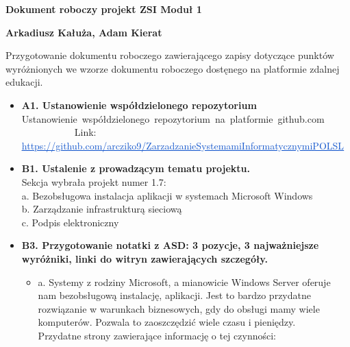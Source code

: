 \documentclass[12pt]{article}
\renewcommand{\_}{\kern-1.5pt\textunderscore\kern-1.5pt}
\begin{document}
\textbf{Dokument roboczy projekt ZSI Moduł 1}\par


\vspace{\baselineskip}
\textbf{Arkadiusz Kałuża, Adam Kierat}\par


\vspace{\baselineskip}
Przygotowanie dokumentu roboczego zawierającego zapisy dotyczące punktów wyróżnionych we wzorze dokumentu roboczego dostęnego na platformie zdalnej edukacji.\par


\vspace{\baselineskip}
\begin{itemize}
	\item \textbf{A1. Ustanowienie współdzielonego repozytorium}\\
Ustanowienie\ współdzielonego\ repozytorium\ na\ platformie\ github.com\ \ \ \ \ \ \ \ \ \ \ \ \ \ \ \       Link: \href{https://github.com/arcziko9/ZarzadzanieSystemamiInformatycznymiPOLSL}{\textcolor[HTML]{1155CC}{\ul{https://github.com/arcziko9/ZarzadzanieSystemamiInformatycznymiPOLSL}}}\\
\par

	\item \textbf{B1. Ustalenie z prowadzącym tematu projektu.}\\
Sekcja wybrała projekt numer 1.7:\\
 \tab a. Bezobsługowa instalacja aplikacji w systemach Microsoft Windows\\
 \tab b. Zarządzanie infrastrukturą sieciową\\
 \tab c. Podpis elektroniczny\\
\par

	\item \textbf{B3. Przygotowanie notatki z ASD: 3 pozycje, 3 najważniejsze wyróżniki, linki do witryn zawierających szczegóły.}\par

\begin{itemize}
	\item a. Systemy z rodziny Microsoft, a mianowicie Windows Server oferuje nam bezobsługową instalację, aplikacji. Jest to bardzo przydatne rozwiązanie w warunkach biznesowych, gdy do obsługi mamy wiele komputerów. Pozwala to zaoszczędzić wiele czasu i pieniędzy.\\
Przydatne strony zawierające informację o tej czynności:\par


\end{itemize}
\end{itemize}
\end{document}
